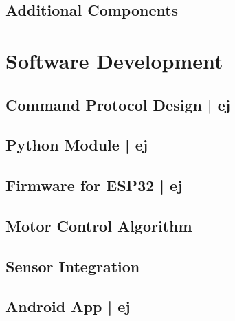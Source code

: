\documentclass[a4paper, 12pt,titlepage,openany]{report}
\begin{document}
	\subsection{Additional Components}
	
	\section{Software Development}
	
	\subsection{Command Protocol Design | \acs{ej}}
	\label{sub:CommandProtDesign}
	
	
	\subsection{Python Module | \acs{ej}}
	
	
	\subsection{Firmware for ESP32 | \acs{ej}}
	
	
	\subsection{Motor Control Algorithm}
	
	\subsection{Sensor Integration}
	
	\subsection{Android App | \acs{ej}}
	\label{sub:AndroidApp}
	
	
\end{document}

